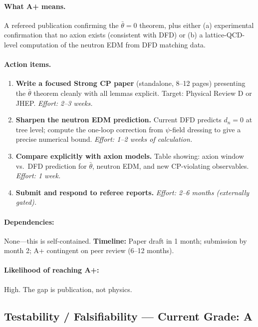 \documentclass[11pt,a4paper]{article}
\begin{document}
\paragraph{What A+ means.}
A refereed publication confirming the $\bar{\theta} = 0$ theorem, plus either (a) experimental confirmation that no axion exists (consistent with DFD) or (b) a lattice-QCD-level computation of the neutron EDM from DFD matching data.

\paragraph{Action items.}
\begin{enumerate}
    \item \textbf{Write a focused Strong CP paper} (standalone, 8--12 pages) presenting the $\bar{\theta}$ theorem cleanly with all lemmas explicit. Target: Physical Review D or JHEP. \emph{Effort: 2--3 weeks.}
    \item \textbf{Sharpen the neutron EDM prediction.} Current DFD predicts $d_n = 0$ at tree level; compute the one-loop correction from $\psi$-field dressing to give a precise numerical bound. \emph{Effort: 1--2 weeks of calculation.}
    \item \textbf{Compare explicitly with axion models.} Table showing: axion window vs.\ DFD prediction for $\bar{\theta}$, neutron EDM, and new CP-violating observables. \emph{Effort: 1 week.}
    \item \textbf{Submit and respond to referee reports.} \emph{Effort: 2--6 months (externally gated).}
\end{enumerate}

\paragraph{Dependencies:} None---this is self-contained. \quad \textbf{Timeline:} Paper draft in 1 month; submission by month 2; A+ contingent on peer review (6--12 months).

\paragraph{Likelihood of reaching A+:} \textcolor{gradeA}{High}. The gap is publication, not physics.

\subsection{Testability / Falsifiability --- Current Grade: A}
\end{document}
